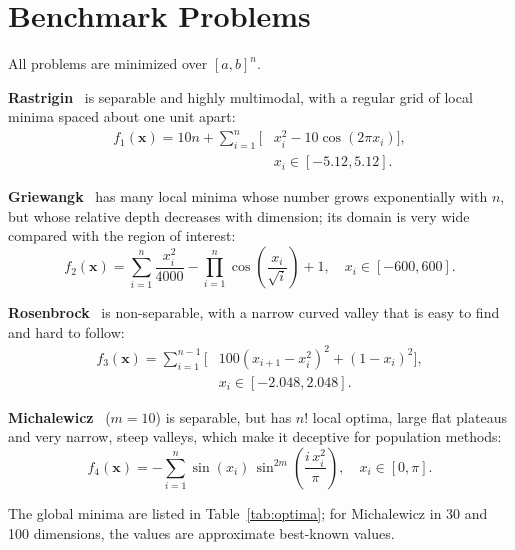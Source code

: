 \documentclass[conference]{IEEEtran}
\begin{document}
\section{Benchmark Problems}\label{sec:problem}
All problems are minimized over $[a,b]^n$.

\textbf{Rastrigin}~\cite{rastrigin1974,muhlenbein1991} is separable and
highly multimodal, with a regular grid of local minima spaced about one
unit apart:
\begin{equation}
\begin{split}
f_1(\mathbf{x}) = 10n + \sum_{i=1}^{n}\Big[&x_i^2 - 10\cos(2\pi x_i)\Big],\\
&x_i\in[-5.12,5.12].
\end{split}
\end{equation}

\textbf{Griewangk}~\cite{griewank1981} has many local minima whose number
grows exponentially with $n$, but whose relative depth decreases with
dimension; its domain is very wide compared with the region of interest:
\begin{equation}
f_2(\mathbf{x}) = \sum_{i=1}^{n}\frac{x_i^2}{4000}
-\prod_{i=1}^{n}\cos\!\left(\frac{x_i}{\sqrt{i}}\right)+1,
\quad x_i\in[-600,600].
\end{equation}

\textbf{Rosenbrock}~\cite{rosenbrock1960} is non-separable, with a narrow
curved valley that is easy to find and hard to follow:
\begin{equation}
\begin{split}
f_3(\mathbf{x}) = \sum_{i=1}^{n-1}\Big[&100(x_{i+1}-x_i^2)^2+(1-x_i)^2\Big],\\
&x_i\in[-2.048,2.048].
\end{split}
\end{equation}

\textbf{Michalewicz}~\cite{michalewicz1996} ($m=10$) is separable, but has
$n!$ local optima, large flat plateaus and very narrow, steep valleys,
which make it deceptive for population methods:
\begin{equation}
f_4(\mathbf{x}) = -\sum_{i=1}^{n}\sin(x_i)\,
\sin^{2m}\!\left(\frac{i\,x_i^2}{\pi}\right),
\quad x_i\in[0,\pi].
\end{equation}

The global minima are listed in Table~\ref{tab:optima}; for Michalewicz in
30 and 100 dimensions, the values are approximate best-known values.
\end{document}
